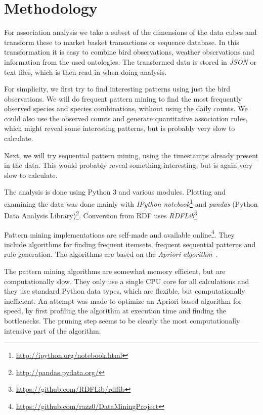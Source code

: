 \documentclass[english]{tktltiki2}
\begin{document}
\section{Methodology}

For association analysis we take a subset of the dimensions of the data cubes and transform these to market basket transactions or sequence database. In this transformation it is easy to combine bird observations, weather observations and information from the used ontologies. The transformed data is stored in \emph{JSON} or text files, which is then read in when doing analysis.

For simplicity, we first try to find interesting patterns using just the bird observations. We will do frequent pattern mining to find the most frequently observed species and species combinations, without using the daily counts. We could also use the observed counts and generate quantitative association rules, which might reveal some interesting patterns, but is probably very slow to calculate.

Next, we will try sequential pattern mining, using the timestamps already present in the data. This would probably reveal something interesting, but is again very slow to calculate.

The analysis is done using Python 3 and various modules. Plotting and examining the data was done mainly with \emph{IPython notebook}\footnote{\url{http://ipython.org/notebook.html}} and \emph{pandas} (Python Data Analysis Library)\footnote{\url{http://pandas.pydata.org/}}. Conversion from RDF uses \emph{RDFLib}\footnote{\url{https://github.com/RDFLib/rdflib}}. 

Pattern mining implementations are self-made and available online\footnote{\url{https://github.com/razz0/DataMiningProject}}. They include algorithms for finding frequent itemsets, frequent sequential patterns and rule generation. The algorithms are based on the \emph{Apriori algorithm}~\cite{tan2006introduction}.

The pattern mining algorithms are somewhat memory efficient, but are computationally slow. They only use a single CPU core for all calculations and they use standard Python data types, which are flexible, but computationally inefficient. An attempt was made to optimize an Apriori based algorithm for speed, by first profiling the algorithm at execution time and finding the bottlenecks. The pruning step seems to be clearly the most computationally intensive part of the algorithm. %
\end{document}
